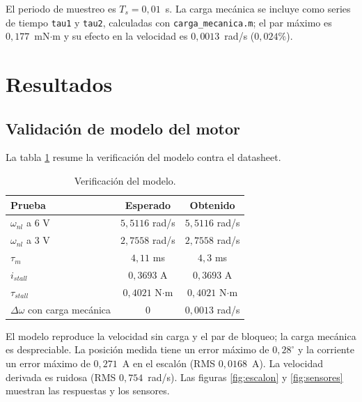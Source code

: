 \documentclass[10pt, letterpaper]{article}
\begin{document}
El periodo de muestreo es $T_s=0{,}01$~s. La carga mecánica se incluye como
series de tiempo \texttt{tau1} y \texttt{tau2}, calculadas con
\texttt{carga\_mecanica.m}; el par máximo es $0{,}177$~mN$\cdot$m y su efecto en
la velocidad es $0{,}0013$~rad/s ($0{,}024\%$).



\section{Resultados}

\subsection{Validación de modelo del motor}

La tabla \ref{tab:verificacion} resume la verificación del modelo contra
el datasheet.

\begin{table}[H]
    \centering
    \caption{Verificación del modelo.}
    \label{tab:verificacion}
    \small
    \begin{tabular}{lcc}
        \toprule
        Prueba & Esperado & Obtenido \\
        \midrule
        $\omega_{nl}$ a 6 V & $5{,}5116$ rad/s & $5{,}5116$ rad/s \\
        $\omega_{nl}$ a 3 V & $2{,}7558$ rad/s & $2{,}7558$ rad/s \\
        $\tau_m$ & $4{,}11$ ms & $4{,}3$ ms \\
        $i_{stall}$ & $0{,}3693$ A & $0{,}3693$ A \\
        $\tau_{stall}$ & $0{,}4021$ N$\cdot$m & $0{,}4021$ N$\cdot$m \\
        $\Delta\omega$ con carga mecánica & $0$ & $0{,}0013$ rad/s \\
        \bottomrule
    \end{tabular}
\end{table}

El modelo reproduce la velocidad sin carga y el par de bloqueo; la carga
mecánica es despreciable. La posición medida tiene un error máximo de
$0{,}28^\circ$ y la corriente un error máximo de $0{,}271$~A en el escalón
(RMS $0{,}0168$~A). La velocidad derivada es ruidosa (RMS $0{,}754$~rad/s). Las
figuras \ref{fig:escalon} y \ref{fig:sensores} muestran las respuestas y los
sensores.
\end{document}
